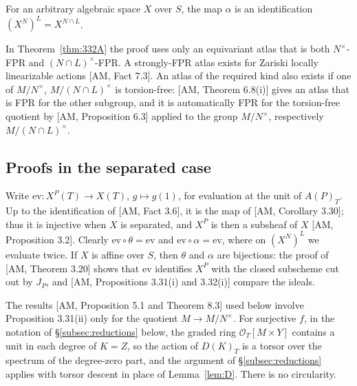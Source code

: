 \begin{theorem}\label{thm:332B}
For an arbitrary algebraic space $X$ over $S$, the map $\alpha$ is an identification $(X^{N})^{L}=X^{N\cap L}$.
\end{theorem}

\begin{remark}\label{rem:atlases}
In Theorem~\ref{thm:332A} the proof uses only an equivariant atlas that is both $N^{\times}$-FPR and $(N\cap L)^{\times}$-FPR. A strongly-FPR atlas exists for Zariski locally linearizable actions [AM, Fact 7.3]. An atlas of the required kind also exists if one of $M/N^{\times}$, $M/(N\cap L)^{\times}$ is torsion-free: [AM, Theorem 6.8(i)] gives an atlas that is FPR for the other subgroup, and it is automatically FPR for the torsion-free quotient by [AM, Proposition 6.3] applied to the group $M/N^{\times}$, respectively $M/(N\cap L)^{\times}$.
\end{remark}

\subsection{Proofs in the separated case}

Write $\mathrm{ev}\colon X^{P}(T)\to X(T)$, $g\mapsto g(1)$, for evaluation at the unit of $A(P)_T$. Up to the identification of [AM, Fact 3.6], it is the map of [AM, Corollary 3.30]; thus it is injective when $X$ is separated, and $X^P$ is then a subsheaf of $X$ [AM, Proposition 3.2]. Clearly $\mathrm{ev}\circ\theta=\mathrm{ev}$ and $\mathrm{ev}\circ\alpha=\mathrm{ev}$, where on $(X^N)^L$ we evaluate twice. If $X$ is affine over $S$, then $\theta$ and $\alpha$ are bijections: the proof of [AM, Theorem 3.20] shows that $\mathrm{ev}$ identifies $X^P$ with the closed subscheme cut out by $J_P$, and [AM, Propositions 3.31(i) and 3.32(i)] compare the ideals.

The results [AM, Proposition 5.1 and Theorem 8.3] used below involve Proposition 3.31(ii) only for the quotient $M\to M/N^{\times}$. For surjective $f$, in the notation of \S\ref{subsec:reductions} below, the graded ring $\mathcal{O}_T[M\times Y]$ contains a unit in each degree of $K=Z$, so the action of $D(K)_T$ is a torsor over the spectrum of the degree-zero part, and the argument of \S\ref{subsec:reductions} applies with torsor descent in place of Lemma~\ref{lem:D}. There is no circularity.

